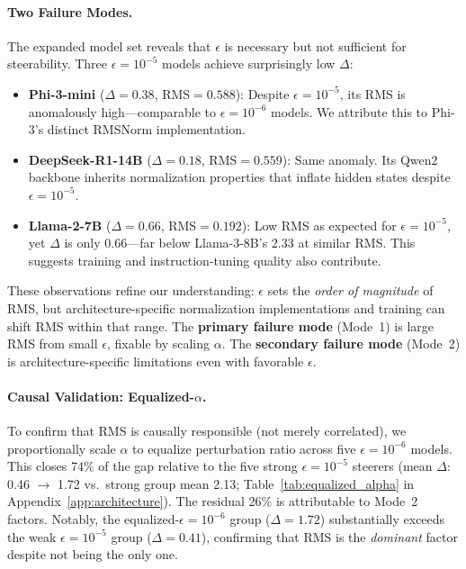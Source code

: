 \documentclass{article}
\begin{document}
\paragraph{Two Failure Modes.} The expanded model set reveals that $\epsilon$ is necessary but not sufficient for steerability. Three $\epsilon{=}10^{-5}$ models achieve surprisingly low $\Delta$:
\begin{itemize}[leftmargin=*,topsep=2pt,itemsep=1pt]
\item \textbf{Phi-3-mini} ($\Delta{=}0.38$, RMS${=}0.588$): Despite $\epsilon{=}10^{-5}$, its RMS is anomalously high---comparable to $\epsilon{=}10^{-6}$ models. We attribute this to Phi-3's distinct RMSNorm implementation.
\item \textbf{DeepSeek-R1-14B} ($\Delta{=}0.18$, RMS${=}0.559$): Same anomaly. Its Qwen2 backbone inherits normalization properties that inflate hidden states despite $\epsilon{=}10^{-5}$.
\item \textbf{Llama-2-7B} ($\Delta{=}0.66$, RMS${=}0.192$): Low RMS as expected for $\epsilon{=}10^{-5}$, yet $\Delta$ is only 0.66---far below Llama-3-8B's 2.33 at similar RMS. This suggests training and instruction-tuning quality also contribute.
\end{itemize}
These observations refine our understanding: $\epsilon$ sets the \emph{order of magnitude} of RMS, but architecture-specific normalization implementations and training can shift RMS within that range. The \textbf{primary failure mode} (Mode~1) is large RMS from small $\epsilon$, fixable by scaling $\alpha$. The \textbf{secondary failure mode} (Mode~2) is architecture-specific limitations even with favorable $\epsilon$.

\paragraph{Causal Validation: Equalized-$\alpha$.} To confirm that RMS is causally responsible (not merely correlated), we proportionally scale $\alpha$ to equalize perturbation ratio across five $\epsilon{=}10^{-6}$ models. This closes 74\% of the gap relative to the five strong $\epsilon{=}10^{-5}$ steerers (mean $\Delta$: 0.46 $\to$ 1.72 vs.\ strong group mean 2.13; Table~\ref{tab:equalized_alpha} in Appendix~\ref{app:architecture}). The residual 26\% is attributable to Mode~2 factors. Notably, the equalized-$\epsilon{=}10^{-6}$ group ($\Delta{=}1.72$) substantially exceeds the weak $\epsilon{=}10^{-5}$ group ($\Delta{=}0.41$), confirming that RMS is the \emph{dominant} factor despite not being the only one.
\end{document}
